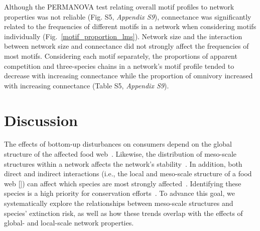\documentclass[12pt]{article}
\begin{document}
\begin{spacing}{2.0}
        Although the PERMANOVA test relating overall motif profiles to network properties was not reliable (Fig. S5, \emph{Appendix S9}), 
        connectance was significantly related to the frequencies of different motifs in a network when considering motifs individually (Fig.~\ref{motif_proportion_lms}).
        Network size and the interaction between network size and connectance did not strongly affect the frequencies of most motifs.
        Considering each motif separately, the proportions of apparent competition and three-species chains in a network's motif profile tended to decrease with increasing connectance while the proportion of omnivory increased with increasing connectance (Table S5, \emph{Appendix S9}). 
    




\section*{Discussion}

    The effects of bottom-up disturbances on consumers depend on the global structure of the affected food web~\citep{Dunne2002, Eklof2006, PascualDunne2006}.
    Likewise, the distribution of meso-scale structures within a network affects the network's stability~\citep{prill2005dynamic, bascompte2005simple}.
    In addition, both direct and indirect interactions (i.e., the local and meso-scale structure of a food web  [\citealp[]{Cirtwill2018FoodWebs}]) can affect which species are most strongly affected~\citep{curtsdotter2011robustness, dunne2009cascading, Eklof2006}. 
    Identifying these species is a high priority for conservation efforts~\citep{Bottrilletal2008}.
    To advance this goal, we systematically explore the relationships between meso-scale structures and species' extinction risk, as well as how these trends overlap with the effects of global- and local-scale network properties.


\end{spacing}
\end{document}
